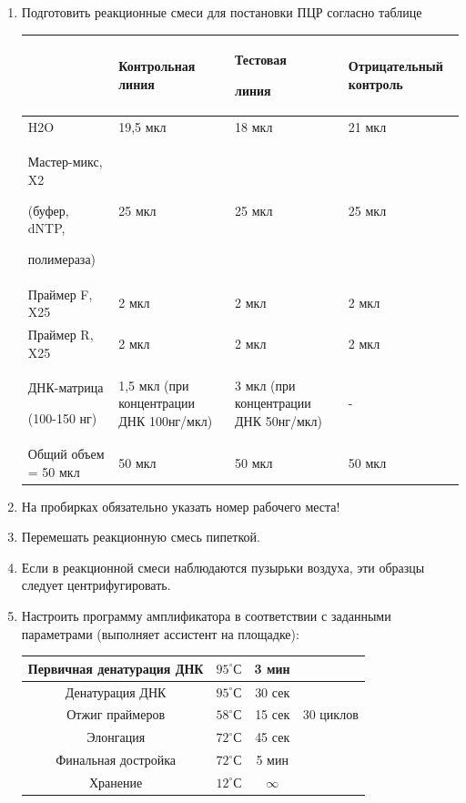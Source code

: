 \begin{enumerate}
    \item Подготовить реакционные смеси для постановки ПЦР согласно таблице
    
    \begin{tabular}{|p{4cm}|p{2.5cm}|p{2.5cm}|p{3cm}|}
        \hline
        & Контрольная линия & Тестовая 
        
        линия & Отрицательный контроль \\
        \hline
        H2O & 19,5 мкл & 18 мкл & 21 мкл \\
        \hline
        Мастер-микс, X2
        
        (буфер, dNTP, 
        
        полимераза) & 25 мкл & 25 мкл & 25 мкл \\
        \hline
        Праймер F, X25 & 2 мкл & 2 мкл & 2 мкл \\ 
        \hline
        Праймер R, X25 & 2 мкл & 2 мкл & 2 мкл \\ 
        \hline
        ДНК-матрица

        (100-150 нг) & 1,5 мкл (при концентрации ДНК 100нг/мкл) & 3 мкл (при концентрации ДНК 50нг/мкл) & - \\
        \hline
        \hline
        Общий объем = 50 мкл & 50 мкл & 50 мкл & 50 мкл \\ 
        \hline       
    \end{tabular}

    \item На пробирках обязательно указать номер рабочего места!
    \item Перемешать реакционную смесь пипеткой.
    \item Если в реакционной смеси наблюдаются пузырьки воздуха, эти образцы следует центрифугировать.
    \item Настроить программу амплификатора в соответствии с заданными параметрами (выполняет ассистент на площадке):
    
    \begin{tabular}{|c|c|c|c|}
        \hline
        Первичная денатурация ДНК & $95^{\circ}С$ & 3 мин & \\	 
        \hline
        Денатурация ДНК & $95^{\circ}С$ & 30 сек & 	\\
        \cline{1-2}
        Отжиг праймеров & $58^{\circ}С$ & 15 сек & 30 циклов \\
        \cline{1-2}
        Элонгация & $72^{\circ}С$ & 45 сек & \\
        \hline
        Финальная достройка & $72^{\circ}С$ & 5 мин & \\	 
        \hline
        Хранение & $12^{\circ}С$ & $\infty$ & \\
        \hline 
    \end{tabular}


\end{enumerate}
